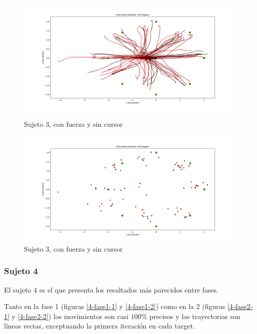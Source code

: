 \documentclass[a4paper,11pt, oneside]{book}
\begin{document}
\begin{figure}[H]
	\begin{minipage}[b]{0.5\linewidth}
		\centering
		\includegraphics[width=\linewidth]{sujeto3/force_no_cursor/trayectorias}
		\caption{Sujeto 3, con fuerza y sin cursor}
		\label{3-fase4-1}
	\end{minipage}
	\hspace{0.5cm}
	\begin{minipage}[b]{0.5\linewidth}
		\centering
		\includegraphics[width=\linewidth]{sujeto3/force_no_cursor/trayectorias_puntos}
		\caption{Sujeto 3, con fuerza y sin cursor}
		\label{3-fase4-2}
	\end{minipage}
\end{figure}



\subsubsection{Sujeto 4}

El sujeto 4 es el que presenta los resultados más parecidos entre fases. 

Tanto en la fase 1 (figuras \ref{4-fase1-1} y \ref{4-fase1-2}) como en la 2 (figuras \ref{4-fase2-1} y \ref{4-fase2-2}) los movimientos son casi $100\%$ precisos y las trayectorias son líneas rectas, exceptuando la primera iteración en cada target.
\end{document}
